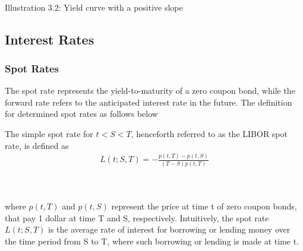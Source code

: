 \begin{center}
    \\[10pt] 
    Illustration 3.2: Yield curve with a positive slope
\end{center}
\subsection{Interest Rates}
\subsubsection{Spot Rates}
The spot rate represents the yield-to-maturity of a zero coupon bond,
while the forward rate refers to the anticipated interest rate in the 
future. The definition for determined spot rates as follows 
below
\begin{definition}\label{def:spot}
    The simple spot rate for $t<S<T$, henceforth referred to as the 
    LIBOR spot rate, is defined as \cite{Bjork} 
    \begin{align*}
        L(t;S,T) = - \frac{p(t,T)-p(t,S)}{(T-S)p(t,T)}
    \end{align*}
\end{definition} 
\noindent
\\\\
where $p(t,T)$ and $p(t,S)$ represent the price at time t of zero coupon bonds, that pay
1 dollar at time T and S, respectively. Intuitively, the spot rate $L(t;S,T)$ is the 
average rate of interest for borrowing or lending money over the time period from S to T, 
where such borrowing or lending is made at time t. 
